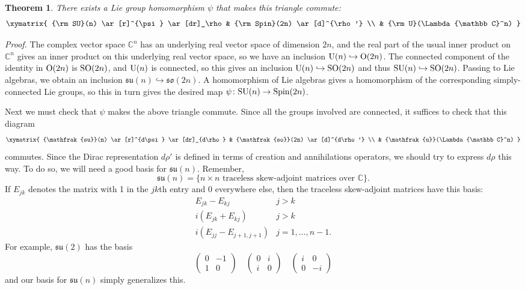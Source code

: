 \documentclass[12pt]{article}
\newcommand{\maps}{\colon}    %
\newcommand{\C}{{\mathbb C}}  %
\renewcommand{\O}{{\rm O}}    %
\newcommand{\U}{{\rm U}}    %
\newcommand{\SO}{{\rm SO}}    %
\newcommand{\SU}{{\rm SU}}    %
\newcommand{\Spin}{{\rm Spin}}    %
\newcommand{\so}{{\mathfrak{so}}}  %
\newcommand{\su}{{\mathfrak{su}}}  %
\renewcommand{\u}{{\mathfrak{u}}}  %
\newcommand{\Ex}{\Lambda} %
\newcommand{\et}{\hspace{-0.08in}{\bf .}\hspace{0.1in}}
\newtheorem{thm}{Theorem}
\begin{document}
\begin{thm}\et
\label{thm:spinor}
        There exists a Lie group homomorphism $\psi$ that makes this 
triangle commute:
	\[
	\xymatrix{
	\SU(n) \ar[r]^{\psi} \ar[dr]_\rho & \Spin(2n) \ar[d]^{\rho'} \\
	                    & \U(\Ex \C^n)
	}
	\]
\end{thm}

\emph{Proof.}  The complex vector space $\C^n$ has an underlying
real vector space of dimension $2n$, and the real part of the 
usual inner product on $\C^n$ gives an inner product on this 
underlying real vector space, so we have an inclusion $\U(n) 
\hookrightarrow \O(2n)$.  The connected component of the identity
in $\O(2n)$ is $\SO(2n)$, and $\U(n)$ is connected, so this gives
an inclusion $\U(n) \hookrightarrow \SO(2n)$ and thus 
$\SU(n) \hookrightarrow \SO(2n)$.  Passing to Lie algebras,
we obtain an inclusion $\su(n) \hookrightarrow \so(2n)$.  
A homomorphism of Lie algebras gives a homomorphism of the
corresponding simply-connected Lie groups, so this in turn gives
the desired map $\psi \maps \SU(n) \to \Spin(2n)$.

Next we must check that $\psi$ makes the above triangle commute.
Since all the groups involved are connected, it suffices to check
that this diagram
\[
\xymatrix{
\su(n) \ar[r]^{d\psi} \ar[dr]_{d\rho} & \so(2n) \ar[d]^{d\rho'} \\
                    & \u(\Ex \C^n)
}
\]
commutes.  Since the Dirac representation
$d\rho'$ is defined in terms of creation and annihilations operators, 
we should try to express $d\rho$ this way.  To do so, we will
need a good basis for $\su(n)$. Remember,
\[ \su(n) = \{n \times n \mbox{ traceless skew-adjoint matrices over } \C \}. \]
If $E_{jk}$ denotes the matrix with 1 in the $jk$th entry and 0 everywhere
else, then the traceless skew-adjoint matrices have this basis:
\[ 
\begin{array}{ll}
E_{jk} - E_{kj} &  j>k  \\
i(E_{jk} + E_{kj}) & j>k  \\
i(E_{jj} - E_{j+1,j+1}) & j=1, \ldots, n-1. 
\end{array} \] 
For example, $\su(2)$ has the basis
\[
\left(
\begin{array}{rr}
	0 & -1 \\
	1 & 0
\end{array}
\right)
\quad
\left(
\begin{array}{rr}
	0 & i \\
	i & 0
\end{array}
\right)
\quad
\left(
\begin{array}{rr}
	i & 0 \\
	0 & -i
\end{array}
\right)
\]
and our basis for $\su(n)$ simply generalizes this.
\end{document}
